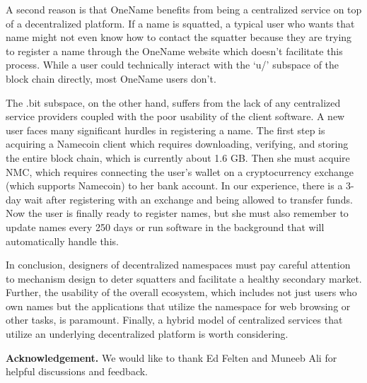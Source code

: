A second reason is that OneName benefits from being a centralized service on top of a decentralized platform. If a name is squatted, a typical user who wants that name might not even know how to contact the squatter because they are trying to register a name through the OneName website which doesn't facilitate this process. While a user could technically interact with the `u/' subspace of the block chain directly, most OneName users don't.

The .bit subspace, on the other hand, suffers from the lack of any centralized service providers coupled with the poor usability of the client software. A new user faces many significant hurdles in registering a name. The first step is acquiring a Namecoin client which requires downloading, verifying, and storing the entire block chain, which is currently about 1.6 GB. Then she must acquire NMC, which requires connecting the user's wallet on a cryptocurrency exchange (which supports Namecoin) to her bank account. In our experience, there is a 3-day wait after registering with an exchange and being allowed to transfer funds. Now the user is finally ready to register names, but she must also remember to update names every 250 days or run software in the background that will automatically handle this.

In conclusion, designers of decentralized namespaces must pay careful attention to mechanism design to deter squatters and facilitate a healthy secondary market. Further, the usability of the overall ecosystem, which includes not just users who own names but the applications that utilize the namespace for web browsing or other tasks, is paramount. Finally, a hybrid model of centralized services that utilize an underlying decentralized platform is worth considering.

{\bf Acknowledgement.} We would like to thank Ed Felten and Muneeb Ali for helpful discussions and feedback.

